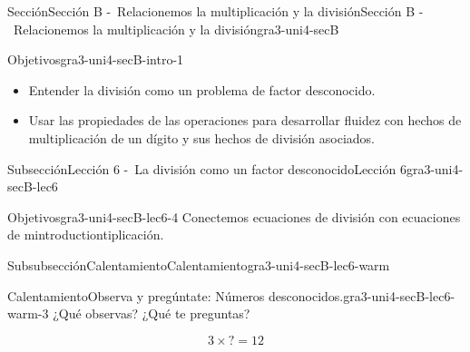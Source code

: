 \documentclass[twoside,10pt,]{article}
\begin{document}
%
%
\typeout{************************************************}
\typeout{************************************************}
%
\begin{sectionptx}{Sección}{Sección B -~Relacionemos la multiplicación y la división}{}{Sección B -~Relacionemos la multiplicación y la división}{}{}{gra3-uni4-secB}
\begin{introduction}{}%
\begin{objectives}{Objetivos}{gra3-uni4-secB-intro-1}
%
\begin{itemize}[label=\textbullet]
\item{}Entender la división como un problema de factor desconocido.%
\item{}Usar las propiedades de las operaciones para desarrollar fluidez con hechos de multiplicación de un dígito y sus hechos de división asociados.%
\end{itemize}
\end{objectives}
\end{introduction}%
%
%
\typeout{************************************************}
\typeout{************************************************}
%
\begin{subsectionptx}{Subsección}{Lección 6 -~La división como un factor desconocido}{}{Lección 6}{}{}{gra3-uni4-secB-lec6}
\begin{objectives}{Objetivos}{gra3-uni4-secB-lec6-4}
Conectemos ecuaciones de división con ecuaciones de mintroductiontiplicación.%
\end{objectives}
%
%
\typeout{************************************************}
\typeout{************************************************}
%
\begin{subsubsectionptx}{Subsubsección}{Calentamiento}{}{Calentamiento}{}{}{gra3-uni4-secB-lec6-warm}
\begin{exploration}{Calentamiento}{Observa y pregúntate: Números desconocidos.}{gra3-uni4-secB-lec6-warm-3}%
¿Qué observas? ¿Qué te preguntas?%
\begin{sidebyside}{2}{0}{0}{0}%
\begin{sbspanel}{0.5}%
%
\begin{equation*}
3\times {?} =12
\end{equation*}
%
\end{sbspanel}%
\begin{sbspanel}{0.5}%
\par

\end{sbspanel}
\end{sidebyside}
\end{exploration}
\end{subsubsectionptx}
\end{subsectionptx}
\end{sectionptx}
\end{document}
